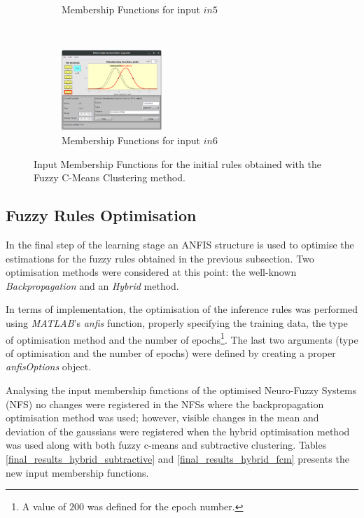 \documentclass[11pt]{article}
\begin{document}
\begin{figure}[ht]
\begin{subfigure}[t]{0.3\textwidth}
		\caption{Membership Functions for input $in5$}
	\end{subfigure}
	~
	\begin{subfigure}[t]{0.3\textwidth}
		\centering
		\includegraphics[height=1.2in]{images/fcm_in6}
		\caption{Membership Functions for input $in6$}
	\end{subfigure}
	\caption{Input Membership Functions for the initial rules obtained with the Fuzzy C-Means Clustering method.}
\end{figure}

\subsection{Fuzzy Rules Optimisation}

In the final step of the learning stage an ANFIS structure is used to optimise the estimations for the fuzzy rules obtained in the previous subsection. Two optimisation methods were considered at this point: the well-known \emph{Backpropagation} and an \emph{Hybrid} method.

In terms of implementation, the optimisation of the inference rules was performed using \emph{MATLAB}'s \emph{anfis} function, properly specifying the training data, the type of optimisation method and the number of epochs\footnote{A value of $200$ was defined for the epoch number.}. The last two arguments (type of optimisation and the number of epochs) were defined by creating a proper \emph{anfisOptions} object.

Analysing the input membership functions of the optimised Neuro-Fuzzy Systems (NFS) no changes were registered in the NFSs where the backpropagation optimisation method was used; however, visible changes in the mean and deviation of the gaussians were registered when the hybrid optimisation method was used along with both fuzzy c-means and subtractive clustering. Tables \ref{final_results_hybrid_subtractive}  and \ref{final_results_hybrid_fcm} presents the new input membership functions.

\pagebreak
\end{document}
